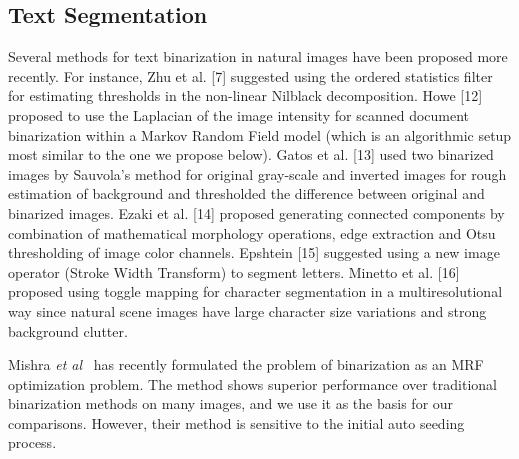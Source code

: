 \subsection{Text Segmentation}
Several methods for text binarization in natural images have
been proposed more recently. For instance, Zhu et al. [7] suggested using the ordered 
statistics ﬁlter for estimating thresholds in the non-linear Nilblack decomposition. Howe [12]
proposed to use the Laplacian of the image intensity for
scanned document binarization within a Markov Random Field
model (which is an algorithmic setup most similar to the one
we propose below). Gatos et al. [13] used two binarized images by Sauvola’s method for original gray-scale and inverted
images for rough estimation of background and thresholded
the difference between original and binarized images. Ezaki
et al. [14] proposed generating connected components by
combination of mathematical morphology operations, edge
extraction and Otsu thresholding of image color channels.
Epshtein [15] suggested using a new image operator (Stroke
Width Transform) to segment letters. Minetto et al. [16]
proposed using toggle mapping for character segmentation in
a multiresolutional way since natural scene images have large
character size variations and strong background clutter.

Mishra {\em et al}~\cite{A16} has recently formulated the problem of binarization as an MRF optimization problem. 
The method shows superior performance over traditional binarization methods on many images, and we use it as the
basis for our comparisons. However, their method is sensitive to the initial auto seeding process.
